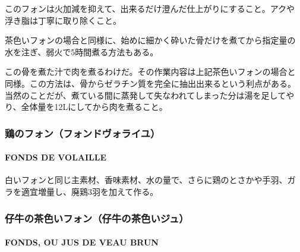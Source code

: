 \documentclass[twoside,12Q,b5j]{escoffierltjsbook}
\newenvironment{recette}{\begin{small}\begin{spacing}{1}\begin{multicols}{2}}{\end{multicols}\end{spacing}\end{small}}
\begin{document}
\begin{recette}
このフォンは火加減を抑えて、出来るだけ澄んだ仕上がりにすること。アクや
浮き脂は丁寧に取り除くこと。

茶色いフォンの場合と同様に、始めに細かく砕いた骨だけを煮てから指定量の
水を注ぎ、弱火で5時間煮る方法もある。

この骨を煮た汁で肉を煮るわけだ。その作業内容は上記茶色いフォンの場合と
同様。この方法は、骨からゼラチン質を完全に抽出出来るという利点がある。
当然のことだが、煮ている間に蒸発して失なわれてしまった分は湯を足してや
り、全体量を12Lにしてから肉を煮ること。

\vspace*{1.7\zw}

\subsubsection{鶏のフォン（フォンドヴォライユ）}\label{ux9d8fux306eux30d5ux30a9ux30f3ux30d5ux30a9ux30f3ux30c9ux30f4ux30a9ux30e9ux30a4ux30e6}

\paragraph{FONDS DE VOLAILLE}\label{fonds-de-volaille}


白いフォンと同じ主素材、香味素材、水の量で、さらに鶏のとさかや手羽、ガ
ラを適宜増量し、廃鶏3羽を加えて作る。

\vspace*{1.7\zw}

\subsubsection{仔牛の茶色いフォン（仔牛の茶色いジュ）}\label{ux4ed4ux725bux306eux8336ux8272ux3044ux30d5ux30a9ux30f3ux4ed4ux725bux306eux8336ux8272ux3044ux30b8ux30e5}

\paragraph{FONDS, OU JUS DE VEAU BRUN}\label{fonds-ou-jus-de-veau-brun}



\end{recette}
\end{document}
